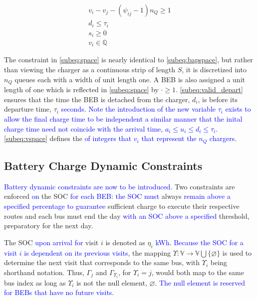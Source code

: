 \documentclass[utf8]{FrontiersinHarvard}
\begin{document}
\begin{subequations}
\label{eq:packconstrs}
\begin{align}
    v_i - v_j - (\psi_{ij} - 1)n_Q \geq 1 \label{subeq:space} \\ d_i \leq \tau_i \label{subeq:valid_depart} \\ s_i \geq
    0 \label{subeq:pos_charge} \\ v_i \in \mathbb{Q} \label{subeq:vspace}
\end{align}
\end{subequations}

The constraint in \autoref{subeq:space} is nearly identical to \autoref{subeq:bapspace}, but rather than viewing the
charger as a continuous strip of length \(S\), it is discretized into \(n_Q\) queues each with a width of unit length one. A
BEB is also assigned a unit length of one which is reflected in \autoref{subeq:space} by \(\cdot \geq 1\).
\autoref{subeq:valid_depart} ensures that the time the BEB is detached from the charger, \(d_i\), is before its departure
time, \(\tau_i\) \textcolor{blue}{seconds. Note the introduction of the new variable $\tau_i$ exists to allow the final charge time to be independent a similar manner that the inital charge time need not coincide with the arrival time, $a_i \le u_i \le d_i \le \tau_i$.} \autoref{subeq:vspace} defines the \textcolor{blue}{of integers that $v_i$ that represent the $n_Q$ chargers}.

\subsection{Battery Charge Dynamic Constraints}
\label{sec:batt_dynamics}
\textcolor{blue}{Battery dynamic constraints are now to be introduced.} Two constraints are enforced
\textcolor{blue}{on} the SOC \textcolor{blue}{for each BEB}: \textcolor{blue}{the SOC must} always \textcolor{blue}{remain above a specified percentage to guarantee} sufficient charge to execute
their respective routes and each bus must end the day \textcolor{blue}{with an SOC above a specified}
threshold, preparatory for the next day.

The SOC \textcolor{blue}{upon arrival for} visit \(i\) is denoted as \(\eta_i\) \textcolor{blue}{kWh}.
\textcolor{blue}{Because the SOC for a visit $i$ is dependent on its previous visits}, the mapping \(\Upsilon:
\mathbb{V} \rightarrow \mathbb{V} \bigcup \{\varnothing\}\) is used to determine the next visit that corresponds to the same bus, with
\(\Upsilon_i\) being shorthand notation. Thus, \(\Gamma_j\) and \(\Gamma_{\Upsilon_i}\), for \(\Upsilon_i = j\), would both map to the same bus index as long
as \(\Upsilon_i\) is not the null element, \(\varnothing\). \textcolor{blue}{The null element is reserved for BEBs that have no future visits.}
\end{document}
